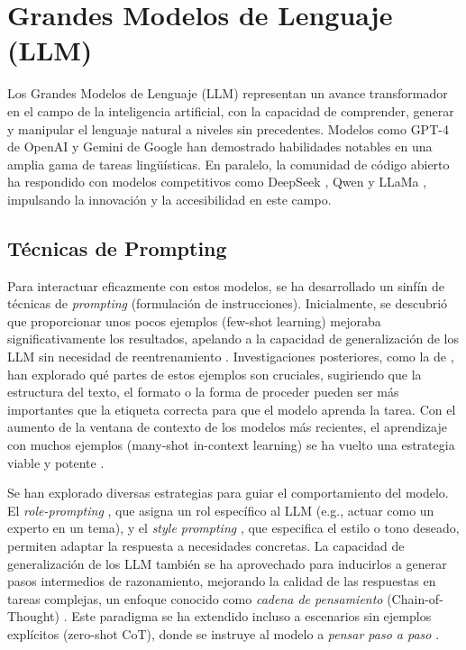 \section{Grandes Modelos de Lenguaje (LLM)}
\label{sec:llm}
Los Grandes Modelos de Lenguaje (LLM) representan un avance transformador en el campo de la inteligencia artificial, con la capacidad de comprender, generar y manipular el lenguaje natural a niveles sin precedentes. Modelos como GPT-4 de OpenAI \citep{openaiGPT4TechnicalReport2024} y Gemini de Google \citep{teamGeminiFamilyHighly2024} han demostrado habilidades notables en una amplia gama de tareas lingüísticas. En paralelo, la comunidad de código abierto ha respondido con modelos competitivos como DeepSeek \citep{deepseek-aiDeepSeekV3TechnicalReport2024}, Qwen \citep{baiQwenTechnicalReport2023} y LLaMa \citep{grattafioriLlama3Herd2024}, impulsando la innovación y la accesibilidad en este campo.

\subsection{Técnicas de Prompting}
\label{subsec:prompting_techniques}
Para interactuar eficazmente con estos modelos, se ha desarrollado un sinfín de técnicas de \textit{prompting} (formulación de instrucciones). Inicialmente, se descubrió que proporcionar unos pocos ejemplos (few-shot learning) mejoraba significativamente los resultados, apelando a la capacidad de generalización de los LLM sin necesidad de reentrenamiento \citep{brownLanguageModelsAre2020}. Investigaciones posteriores, como la de \cite{minRethinkingRoleDemonstrations2022}, han explorado qué partes de estos ejemplos son cruciales, sugiriendo que la estructura del texto, el formato o la forma de proceder pueden ser más importantes que la etiqueta correcta para que el modelo aprenda la tarea. Con el aumento de la ventana de contexto de los modelos más recientes, el aprendizaje con muchos ejemplos (many-shot in-context learning) se ha vuelto una estrategia viable y potente \citep{agarwalManyShotInContextLearning2024}.

Se han explorado diversas estrategias para guiar el comportamiento del modelo. El \textit{role-prompting} \citep{kongBetterZeroShotReasoning2024}, que asigna un rol específico al LLM (e.g., actuar como un experto en un tema), y el \textit{style prompting} \citep{luBoundingCapabilitiesLarge2023}, que especifica el estilo o tono deseado, permiten adaptar la respuesta a necesidades concretas. La capacidad de generalización de los LLM también se ha aprovechado para inducirlos a generar pasos intermedios de razonamiento, mejorando la calidad de las respuestas en tareas complejas, un enfoque conocido como \textit{cadena de pensamiento} (Chain-of-Thought) \citep{nyeShowYourWork2021, weiChainofThoughtPromptingElicits2023}. Este paradigma se ha extendido incluso a escenarios sin ejemplos explícitos (zero-shot CoT), donde se instruye al modelo a \textit{pensar paso a paso} \citep{kojimaLargeLanguageModels2023, wangPlanandSolvePromptingImproving2023}.


